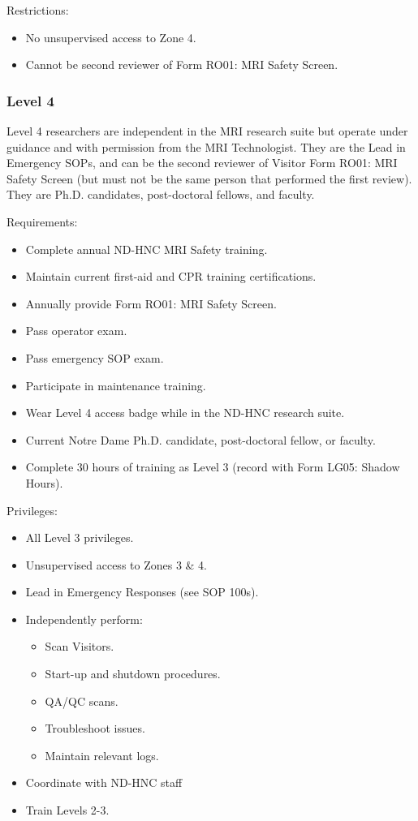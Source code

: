 \documentclass[11pt]{article}
\begin{document}
Restrictions:
\begin{itemize}
	\item No unsupervised access to Zone 4.
	\item Cannot be second reviewer of Form RO01: MRI Safety Screen.
\end{itemize}


\subsubsection{Level 4}
\label{sssec:access-levels-4}

Level 4 researchers are independent in the MRI research suite but operate under guidance and with permission from the MRI Technologist. They are the Lead in Emergency SOPs, and can be the second reviewer of Visitor Form RO01: MRI Safety Screen (but must not be the same person that performed the first review). They are Ph.D. candidates, post-doctoral fellows, and faculty.

Requirements:
\begin{itemize}
	\item Complete annual ND-HNC MRI Safety training.
	\item Maintain current first-aid and CPR training certifications.
	\item Annually provide Form RO01: MRI Safety Screen.
	\item Pass operator exam.
	\item Pass emergency SOP exam.
	\item Participate in maintenance training.
	\item Wear Level 4 access badge while in the ND-HNC research suite.
	\item Current Notre Dame Ph.D. candidate, post-doctoral fellow, or faculty.
	\item Complete 30 hours of training as Level 3 (record with Form LG05: Shadow Hours).
\end{itemize}

Privileges:
\begin{itemize}
	\item All Level 3 privileges.
	\item Unsupervised access to Zones 3 \& 4.
	\item Lead in Emergency Responses (see SOP 100s).
	\item Independently perform:
	\begin{itemize}
		\item Scan Visitors.
		\item Start-up and shutdown procedures.
		\item QA/QC scans.
		\item Troubleshoot issues.
		\item Maintain relevant logs.
	\end{itemize}
	\item Coordinate with ND-HNC staff
	\item Train Levels 2-3.
\end{itemize}
\end{document}
